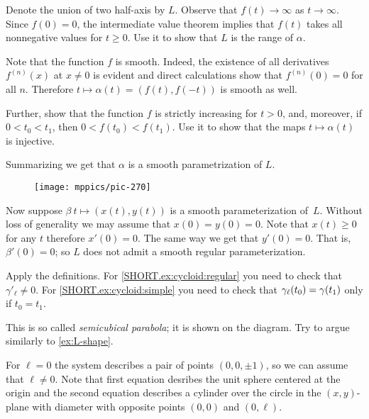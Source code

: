 Denote the union of two half-axis by $L$.
Observe that $f(t)\to\infty$ as $t\to \infty$.
Since $f(0)=0$, the intermediate value theorem implies that $f(t)$ takes all nonnegative values for $t\ge 0$.
Use it to show that $L$ is the range of $\alpha$.

Note that the function $f$
is smooth.
Indeed, the existence of all derivatives $f^{(n)}(x)$ at $x\ne 0$ is evident and direct calculations show that $f^{(n)}(0)=0$ for all $n$.
Therefore $t\mapsto \alpha(t)=(f(t),f(-t))$ is smooth as well.

Further, show that the function $f$ is strictly increasing for $t> 0$,
and, moreover, if $0<t_0<t_1$, then $0<f(t_0)<f(t_1)$.
Use it to show that the maps $t\mapsto \alpha(t)$ is injective.

Summarizing we get that $\alpha$ is a smooth parametrization of $L$. 

\begin{wrapfigure}[12]{r}{24 mm}
\vskip-4mm
\centering
\texttt{[image: mppics/pic-270]}
\vskip0mm
\end{wrapfigure}

Now suppose $\beta\:t\mapsto (x(t),y(t))$ is a smooth parameterization of~$L$.
Without loss of generality we may assume that $x(0)=y(0)=0$.
Note that $x(t)\ge 0$ for any $t$ therefore $x'(0)=0$.
The same way we get that $y'(0)=0$.
That is, $\beta'(0)=0$;
so $L$ does not admit a smooth regular parameterization.

Apply the definitions.
For \ref{SHORT.ex:cycloid:regular} you need to check that $\gamma'_\ell\ne 0$.
For \ref{SHORT.ex:cycloid:simple} you need to check that $\gamma_\ell(t_0)\z=\gamma(t_1)$ only if $t_0=t_1$.

This is so called \emph{semicubical parabola}; it is shown on the diagram.
Try to argue similarly to \ref{ex:L-shape}.


For $\ell=0$ the system describes a pair of points $(0,0,\pm1)$, so we can assume that $\ell\ne 0$.
Note that first equation desribes the unit sphere centered at the origin
and the second equation describes a cylinder over the circle in the $(x,y)$-plane with diameter with opposite points $(0,0)$ and $(0,\ell)$.

